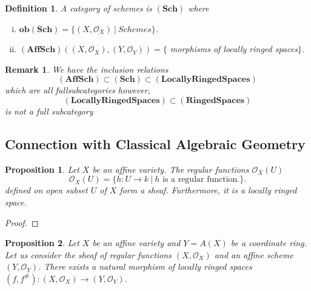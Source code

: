 \documentclass{article}
\newtheorem{proposition}{Proposition}[section]
\newtheorem{definition}{Definition}[section]
\newtheorem{remark}{Remark}[section]
\numberwithin{equation}{section}
\begin{document}
\begin{definition}
A category of schemes is $(\mathbf{Sch})$ where 
\begin{enumerate}[i).]
\item $\mathbf{ob}(\mathbf{Sch}) = \{(X,\mathcal{O}_X)\:|\: Schemes\}$.
\item $(\mathbf{AffSch})((X,\mathcal{O}_X),(Y,\mathcal{O}_Y)) =\{$ morphisms of locally ringed spaces$\}$.
\end{enumerate}
\end{definition}


\begin{remark}
We have the inclusion relations
\begin{equation*}
(\mathbf{AffSch})\subset(\mathbf{Sch})\subset(\mathbf{Locally Ringed Spaces})
\end{equation*}
which are all fullsubcategories however, 
\begin{equation*}
(\mathbf{Locally Ringed Spaces})\subset(\mathbf{Ringed Spaces})
\end{equation*}
is not a full subcategory
\end{remark}

\subsection{Connection with Classical Algebraic Geometry}

\begin{proposition}
Let $X$ be an affine variety. The regular functions $\mathcal{O}_X(U)$ 
\begin{equation*}
\mathcal{O}_X(U) = \{h:U\to k\:|\: h\text{ is a regular function.}\}.
\end{equation*}
defined on open subset $U$ of $X$ form a sheaf. Furthermore, it is a locally ringed space.
\end{proposition}

\begin{proof}
\end{proof}

\begin{proposition}
Let $X$ be an affine variety and $Y=A(X)$ be a coordinate ring. Let us consider the sheaf of regular functions $(X,\mathcal{O}_X)$ and an affine scheme $(Y,\mathcal{O}_Y)$. There exists a natural morphism of locally ringed spaces $(f,f^{\#}):(X,\mathcal{O}_X)\to(Y,\mathcal{O}_Y)$.
\end{proposition}
\end{document}
